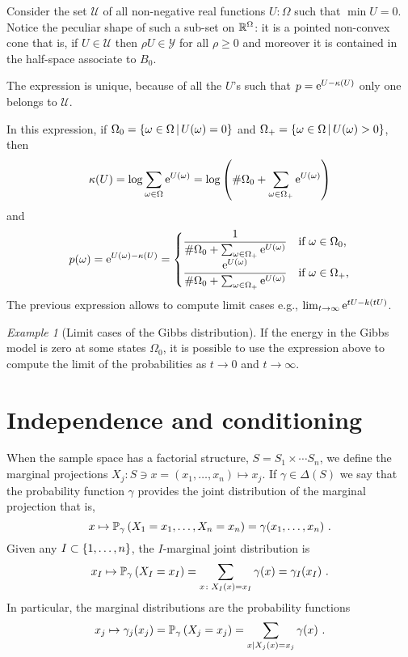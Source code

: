 \documentclass[12pt,a4paper]{amsart}
\theoremstyle{plain}%
\theoremstyle{definition}
\theoremstyle{remark}
\newtheorem{example}{Example}
\begin{document}
Consider the set $\mathcal U$ of all non-negative real functions $U : \Omega$ such that $\min U = 0$. Notice the peculiar shape of such a sub-set on $\mathbb{R}^\Omega$: it is a pointed non-convex cone that is, if $U \in \mathcal U$ then $\rho U \in \mathcal Y$ for all $\rho \geq 0$ and moreover it is contained in the half-space associate to $B_0$.

The expression is unique, because of all the $U$'s such that $p = \mathrm{e}^{U-\kappa(U)}$ only one belongs to $\mathcal U$.
  
In this expression, if $\Omega_0 = \left\{\omega \in \Omega \, \middle| \, U(\omega)=0 \right\}$ and $\Omega_+ = \left\{\omega \in \Omega \, \middle| \, U(\omega) > 0 \right\}$, then
  \begin{equation*}
 \kappa(U) = \log \sum_{\omega\in\Omega} \mathrm{e}^{U(\omega)} = \log\left(\# \Omega_0 + \sum_{\omega\in\Omega_+} \mathrm{e}^{U(\omega)}\right)  
  \end{equation*}
and
\begin{equation*}
    p(\omega) = \mathrm{e}^{U(\omega) - \kappa(U)} =
    \begin{cases}
      \dfrac1{\# \Omega_0 + \sum_{\omega\in\Omega_+} \mathrm{e}^{U(\omega)}} &\text{if $\omega \in \Omega_0$,} \\
      \dfrac{\mathrm{e}^{U(\omega)}}{ \# \Omega_0 + \sum_{\omega\in\Omega_+} \mathrm{e}^{U(\omega)}} &\text{if $\omega \in \Omega_+$,} \end{cases}
\end{equation*}
The previous expression allows to compute limit cases e.g., $\lim_{t \to \infty} \mathrm{e}^{tU - k(tU)}$.

\begin{example}[Limit cases of the Gibbs distribution]
If the energy in the Gibbs model is zero at some states $\Omega_0$, it is possible to use the expression above to compute the limit of the probabilities as $t \to 0$ and $t \to \infty$.  
\end{example}

\section{Independence and conditioning}
\label{sec:indep-cond}
When the sample space has a factorial structure, $S=S_1 \times \cdots S_n$, we define the marginal projections $X_j \colon S \ni x = (x_1,\dots,x_n) \mapsto x_j$. If $\gamma \in \Delta(S)$ we say that the probability function $\gamma$ provides the joint distribution of the marginal projection that is,
\begin{equation*}
  x \mapsto \operatorname{\mathbb P}_{\gamma}\left(X_1=x_1,\dots,X_n=x_n\right) = \gamma(x_1,\dots,x_n) \ .
\end{equation*}
Given any $I \subset \left\{1,\dots,n\right\}$, the $I$-marginal joint distribution is
\begin{equation*}
  x_I \mapsto \operatorname{\mathbb P}_{\gamma}\left(X_I = x_I\right) = \sum_{x \colon X_I(x)=x_I} \gamma(x) = \gamma_I(x_I) \ .
\end{equation*}
In particular, the marginal distributions are the probability functions
\begin{equation*}
 x_j \mapsto \gamma_j(x_j) = \operatorname{\mathbb P}_{\gamma}\left(X_j = x_j\right) = \sum_{x | X_j(x) = x_j} \gamma(x) \ .
\end{equation*}
\end{document}
